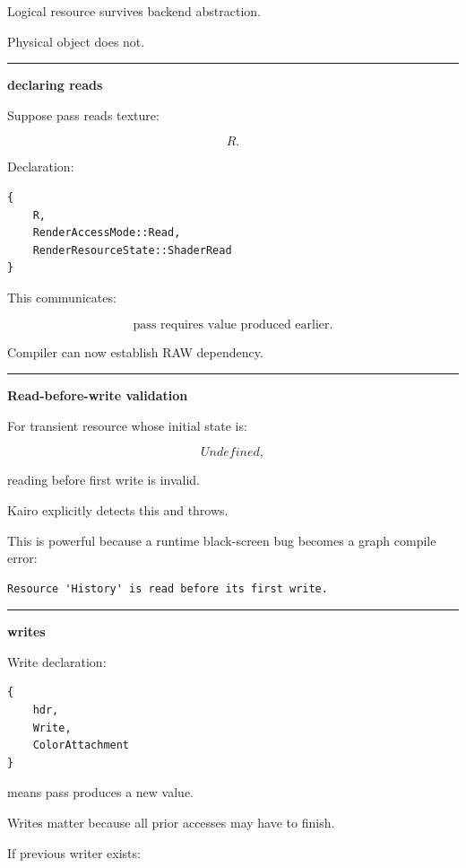 Logical resource survives backend abstraction.

Physical object does not.

\begin{center}\rule{0.5\linewidth}{0.5pt}\end{center}

\textbf{declaring reads}

Suppose pass reads texture:

\[
R.
\]

Declaration:

\begin{verbatim}
{
    R,
    RenderAccessMode::Read,
    RenderResourceState::ShaderRead
}
\end{verbatim}

This communicates:

\[
\boxed{
\text{pass requires value produced earlier}.
}
\]

Compiler can now establish RAW dependency.

\begin{center}\rule{0.5\linewidth}{0.5pt}\end{center}

\textbf{Read-before-write validation}

For transient resource whose initial state is:

\[
Undefined,
\]

reading before first write is invalid.

Kairo explicitly detects this and throws.

This is powerful because a runtime black-screen bug becomes a graph compile error:

\begin{verbatim}
Resource 'History' is read before its first write.
\end{verbatim}

\begin{center}\rule{0.5\linewidth}{0.5pt}\end{center}

\textbf{writes}

Write declaration:

\begin{verbatim}
{
    hdr,
    Write,
    ColorAttachment
}
\end{verbatim}

means pass produces a new value.

Writes matter because all prior accesses may have to finish.

If previous writer exists:

